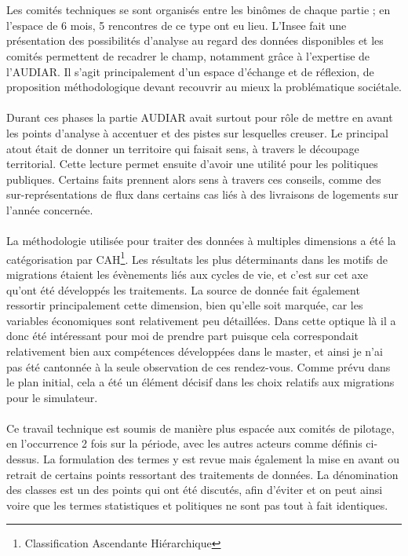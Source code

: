 \documentclass{bredele}
\begin{document}
\\\\Les comités techniques se sont organisés entre les binômes de chaque partie ; en l’espace de 6 mois, 5 rencontres de ce type ont eu lieu. L’Insee fait une présentation des possibilités d’analyse au regard des données disponibles et les comités permettent de recadrer le champ, notamment grâce à l’expertise de l’AUDIAR. Il s’agit principalement d’un espace d’échange et de réflexion, de proposition méthodologique devant recouvrir au mieux la problématique sociétale.
\\\\Durant ces phases la partie AUDIAR avait surtout pour rôle de mettre en avant les points d'analyse à accentuer et des pistes sur lesquelles creuser. Le principal atout était de donner un territoire qui faisait sens, à travers le découpage territorial. Cette lecture permet ensuite d'avoir une utilité pour les politiques publiques. Certains faits prennent alors sens à travers ces conseils, comme des sur-représentations de flux dans certains cas liés à des livraisons de logements sur l'année concernée.
\\\\La méthodologie utilisée pour traiter des données à multiples dimensions a été la catégorisation par CAH\footnote{Classification Ascendante Hiérarchique}. Les résultats les plus déterminants dans les motifs de migrations étaient les évènements liés aux cycles de vie, et c'est sur cet axe qu'ont été développés les traitements. La source de donnée fait également ressortir principalement cette dimension, bien qu'elle soit marquée, car les variables économiques sont relativement peu détaillées. Dans cette optique là il a donc été intéressant pour moi de prendre part puisque cela correspondait relativement bien aux compétences développées dans le master, et ainsi je n'ai pas été cantonnée à la seule observation de ces rendez-vous. Comme prévu dans le plan initial, cela a été un élément décisif dans les choix relatifs aux migrations pour le simulateur.
\\\\Ce travail technique est soumis de manière plus espacée aux comités de pilotage, en l’occurrence 2 fois sur la période, avec les autres acteurs comme définis ci-dessus. La formulation des termes y est revue mais également la mise en avant ou retrait de certains points ressortant des traitements de données. La dénomination des classes est un des points qui ont été discutés, afin d'éviter et on peut ainsi voire que les termes statistiques et politiques ne sont pas tout à fait identiques.
\end{document}
